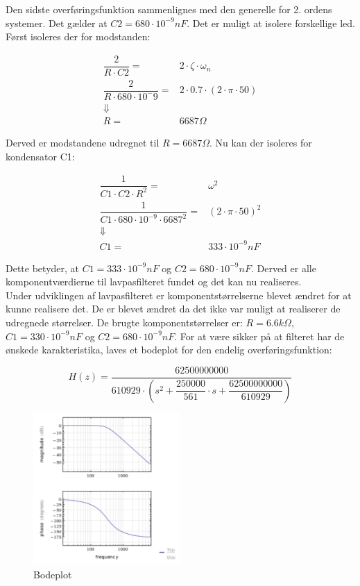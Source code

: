 Den sidste overføringsfunktion sammenlignes med den generelle for 2. ordens systemer. Det gælder at $ C2 = 680\cdot 10^{-9} nF $. Det er muligt at isolere forskellige led. Først isoleres der for modstanden:
\begin{ceqn}
\begin{equation}
\begin{split}
\dfrac{2}{R\cdot C2}=& 2\cdot \zeta \cdot \omega_n\\
\dfrac{2}{R\cdot 680\cdot 10^-9}=&2\cdot 0.7 \cdot(2\cdot\pi\cdot 50)\\
\Downarrow\\
 R=& 6687 \Omega
\end{split}
\end{equation}
\end{ceqn}
Derved er modstandene udregnet til $ R = 6687\Omega $. Nu kan der isoleres for kondensator C1:
\begin{ceqn} 
\begin{equation}
\begin{split}
\dfrac{1}{C1\cdot C2\cdot R^2}=& \omega^2\\
\dfrac{1}{C1\cdot 680\cdot 10^{-9}\cdot 6687^2}=& (2\cdot \pi \cdot 50)^2\\
\Downarrow\\
C1= &333\cdot 10^{-9} nF
\end{split}
\end{equation}
\end{ceqn}
Dette betyder, at $ C1 = 333\cdot 10^{-9} nF $  og  $ C2 = 680\cdot 10^{-9} nF$. Derved er alle komponentværdierne til lavpasfilteret fundet og det kan nu realiseres. \\ 
\newline
Under udviklingen af lavpasfilteret er komponentstørrelserne blevet ændret for at kunne realisere det. De er blevet ændret da det ikke var muligt at realiserer de udregnede størrelser. De brugte komponentstørrelser er: $ R= 6.6 k\Omega $, $ C1= 330\cdot 10 ^{-9} nF$ og $ C2= 680\cdot 10^{-9} nF$.   
For at være sikker på at filteret har de ønskede karakteristika, laves et bodeplot for den endelig overføringsfunktion:
\begin{ceqn}
\begin{equation}
H(z)=\dfrac{62500000000}{610929\cdot \left( s^2+\dfrac{250000}{561}\cdot s + \dfrac{62500000000}{610929} \right)}
\end{equation}
\end{ceqn}
\begin{figure}[H]
	\centering
	\includegraphics[width=0.5\textwidth]{Figurer/Bodeplot}
	\caption{Bodeplot}
	\label{fig:bodeplot}
\end{figure}
